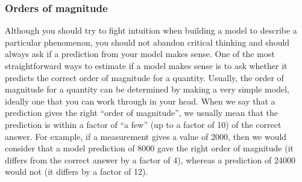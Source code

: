 \subsubsection{Orders of magnitude}

Although you should try to fight intuition when building a model to describe a particular phenomenon, you should not abandon critical thinking and should always ask if a prediction from your model makes sense. One of the most straightforward ways to estimate if a model makes sense is to ask whether it predicts the correct order of magnitude for a quantity. Usually, the order of magnitude for a quantity can be determined by making a very simple model, ideally one that you can work through in your head. When we say that a prediction gives the right ``order of magnitude'', we usually mean that the prediction is within a factor of ``a few'' (up to a factor of 10) of the correct answer. For example, if a measurement gives a value of 2000, then we would consider that a model prediction of 8000 gave the right order of magnitude (it differs from the correct answer by a factor of 4), whereas a prediction of 24000 would not (it differs by a factor of 12).

